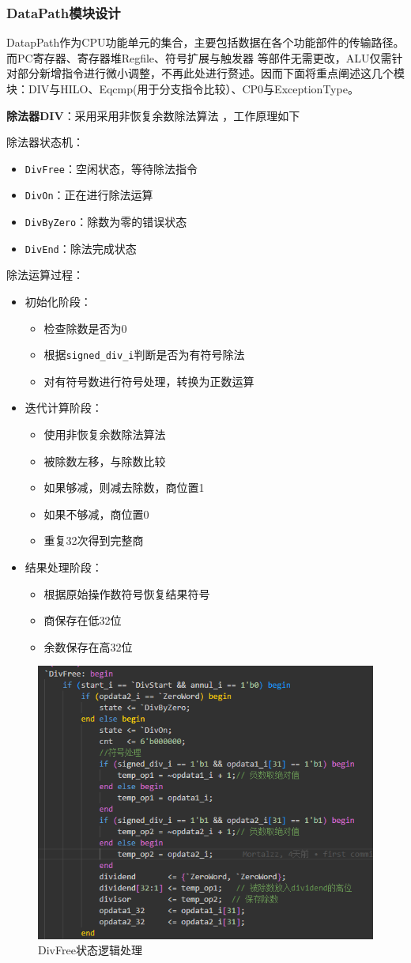\subsubsection{DataPath模块设计}
DatapPath作为CPU功能单元的集合，主要包括数据在各个功能部件的传输路径。而PC寄存器、寄存器堆Regfile、符号扩展与触发器 等部件无需更改，ALU仅需针对部分新增指令进行微小调整，不再此处进行赘述。因而下面将重点阐述这几个模块：DIV与HILO、Eqcmp(用于分支指令比较）、CP0与ExceptionType。

\textbf{除法器DIV}：采用采用非恢复余数除法算法 ，工作原理如下

除法器状态机：
\begin{itemize}
\item \verb|DivFree|：空闲状态，等待除法指令
\item \verb|DivOn|：正在进行除法运算
\item \verb|DivByZero|：除数为零的错误状态
\item \verb|DivEnd|：除法完成状态
\end{itemize}
除法运算过程：
\begin{itemize}
\item 初始化阶段：
\begin{itemize}
	\item 检查除数是否为0
	\item 根据\verb|signed_div_i|判断是否为有符号除法
	\item 对有符号数进行符号处理，转换为正数运算
\end{itemize}
\item 迭代计算阶段：
\begin{itemize}
	\item 使用非恢复余数除法算法
	\item 被除数左移，与除数比较
	\item 如果够减，则减去除数，商位置1
	\item 如果不够减，商位置0
	\item 重复32次得到完整商
\end{itemize}
\item 结果处理阶段：
\begin{itemize}
	\item 根据原始操作数符号恢复结果符号
	\item 商保存在低32位
	\item 余数保存在高32位
\end{itemize}
\end{itemize}

\begin{figure}
\centering
\includegraphics[width=0.5\linewidth]{image/p2.png}
\caption{DivFree状态逻辑处理}
\label{fig:enter-label}
\end{figure}

